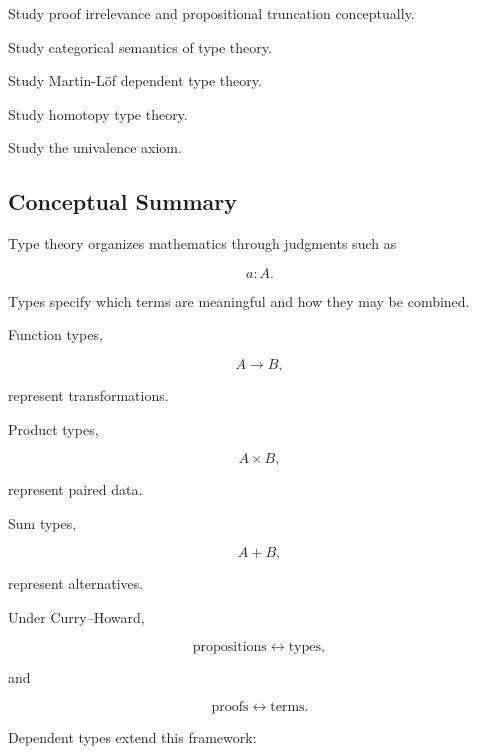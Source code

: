 \begin{exercise}[4]
Study proof irrelevance and propositional truncation conceptually.
\end{exercise}

\begin{exercise}[4]
Study categorical semantics of type theory.
\end{exercise}

\begin{exercise}[4]
Study Martin-Löf dependent type theory.
\end{exercise}

\begin{exercise}[4]
Study homotopy type theory.
\end{exercise}

\begin{exercise}[4]
Study the univalence axiom.
\end{exercise}

\subsection{Conceptual Summary}
\label{subsec:type-theory-summary}

Type theory organizes mathematics through judgments such as

\[
\boxed{
a:A.
}
\]

Types specify which terms are meaningful and how they may be combined.

Function types,

\[
\boxed{
A\to B,
}
\]

represent transformations.

Product types,

\[
\boxed{
A\times B,
}
\]

represent paired data.

Sum types,

\[
\boxed{
A+B,
}
\]

represent alternatives.

Under Curry--Howard,

\[
\boxed{
\text{propositions}
\leftrightarrow
\text{types},
}
\]

and

\[
\boxed{
\text{proofs}
\leftrightarrow
\text{terms}.
}
\]

Dependent types extend this framework:

